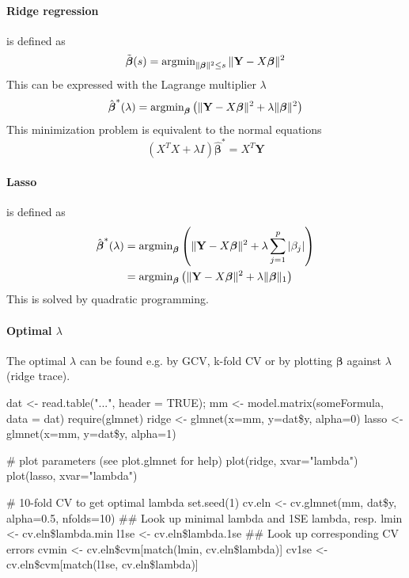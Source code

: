 \begin{theory}
 \paragraph{Ridge regression} is defined as
 \begin{equation*}
  \tilde{\boldsymbol{\beta}}(s) = \operatorname{arg min}_{\|\boldsymbol{\beta}\|^2 \leq s} \|\mathbf{Y} - X \boldsymbol{\beta}\|^2
 \end{equation*}
 This can be expressed with the Lagrange multiplier $\lambda$
 \begin{equation*}
  \hat{\boldsymbol{\beta}}^{\ast}(\lambda) = \operatorname{arg min}_{\boldsymbol{\beta}} \left( \|\mathbf{Y} - X\boldsymbol{\beta}\|^2 + \lambda \|\boldsymbol{\beta}\|^2 \right)
 \end{equation*}
 This minimization problem is equivalent to the normal equations
 \begin{equation*}
  (X^TX+\lambda I) \hat{\boldsymbol{\beta}}^{\ast} = X^T\mathbf{Y}
 \end{equation*}

 \paragraph{Lasso} is defined as
 \begin{align*}
  \hat{\boldsymbol{\beta}}^{\ast}(\lambda) &= \operatorname{arg min}_{\boldsymbol{\beta}} \left( \|\mathbf{Y} - X\boldsymbol{\beta}\|^2 + \lambda \sum_{j=1}^p |\beta_j| \right)\\
                                           &= \operatorname{arg min}_{\boldsymbol{\beta}} \left( \|\mathbf{Y} - X\boldsymbol{\beta}\|^2 + \lambda \|\boldsymbol{\beta}\|_1 \right)
 \end{align*} 
 This is solved by quadratic programming.
 \paragraph{Optimal $\lambda$} The optimal $\lambda$ can be found e.g. by GCV, k-fold CV or by plotting $\boldsymbol{\beta}$ against $\lambda$ (ridge trace).
\end{theory}

\begin{code}
 dat <- read.table("...", header = TRUE);
 mm <- model.matrix(someFormula, data = dat)
 require(glmnet)
 ridge <- glmnet(x=mm, y=dat\$y, alpha=0)
 lasso <- glmnet(x=mm, y=dat\$y, alpha=1)
 
 # plot parameters (see plot.glmnet for help)
 plot(ridge, xvar="lambda")
 plot(lasso, xvar="lambda")
 
 # 10-fold CV to get optimal lambda
 set.seed(1)
 cv.eln <- cv.glmnet(mm, dat\$y, alpha=0.5, nfolds=10)
 ## Look up minimal lambda and 1SE lambda, resp.
 lmin <- cv.eln\$lambda.min
 l1se <- cv.eln\$lambda.1se
 ## Look up corresponding CV errors
 cvmin <- cv.eln\$cvm[match(lmin, cv.eln\$lambda)]
 cv1se <- cv.eln\$cvm[match(l1se, cv.eln\$lambda)]
 
\end{code}
